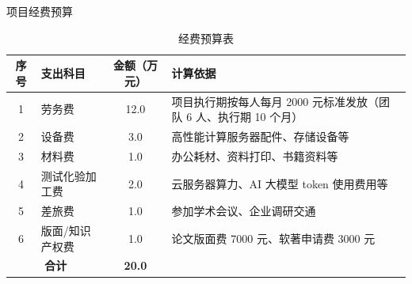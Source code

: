 \begin{frame}{项目经费预算}
    \begin{table}
        \centering
        \caption{经费预算表}
        \vspace{-10pt}
        \begin{tabular}{clcp{7cm}}
            \toprule
            \textbf{序号} & \textbf{支出科目} & \textbf{金额（万元）} & \textbf{计算依据} \\
            \midrule
            1 & 劳务费 & 12.0 & 项目执行期按每人每月 2000 元标准发放（团队 6 人、执行期 10 个月） \\
            2 & 设备费 & 3.0 & 高性能计算服务器配件、存储设备等 \\
            3 & 材料费 & 1.0 & 办公耗材、资料打印、书籍资料等 \\
            4 & 测试化验加工费 & 2.0 & 云服务器算力、AI 大模型 token 使用费用等 \\
            5 & 差旅费 & 1.0 & 参加学术会议、企业调研交通 \\
            6 & 版面/知识产权费 & 1.0 & 论文版面费 7000 元、软著申请费 3000 元 \\
            \midrule
            \multicolumn{2}{c}{\textbf{合计}} & \textbf{20.0} & \\
            \bottomrule
        \end{tabular}
    \end{table}
\end{frame}